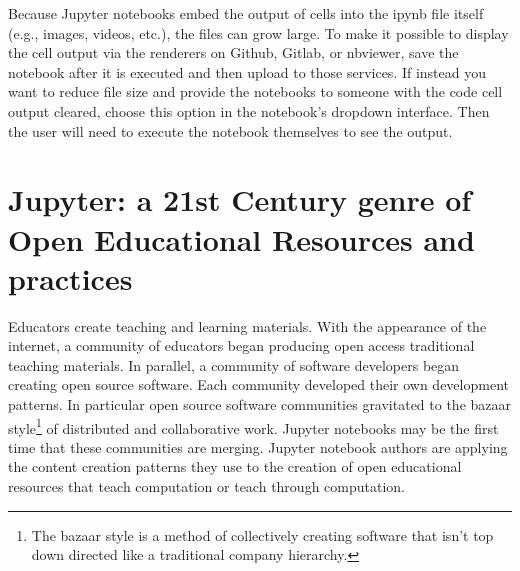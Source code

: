 \documentclass[]{book}
\let\rmarkdownfootnote\footnote%
\def\footnote{\protect\rmarkdownfootnote}
\begin{document}
Because Jupyter notebooks embed the output of cells into the ipynb file
itself (e.g., images, videos, etc.), the files can grow large. To make
it possible to display the cell output via the renderers on Github,
Gitlab, or nbviewer, save the notebook after it is executed and then
upload to those services. If instead you want to reduce file size and
provide the notebooks to someone with the code cell output cleared,
choose this option in the notebook's dropdown interface. Then the user
will need to execute the notebook themselves to see the output.

\section{Jupyter: a 21st Century genre of Open Educational Resources and
practices}\label{jupyter-a-21st-century-genre-of-open-educational-resources-and-practices}

Educators create teaching and learning materials. With the appearance of
the internet, a community of educators began producing open access
traditional teaching materials. In parallel, a community of software
developers began creating open source software. Each community developed
their own development patterns. In particular open source software
communities gravitated to the bazaar style\footnote{The bazaar style is
  a method of collectively creating software that isn't top down
  directed like a traditional company hierarchy.} of distributed and
collaborative work. Jupyter notebooks may be the first time that these
communities are merging. Jupyter notebook authors are applying the
content creation patterns they use to the creation of open educational
resources that teach computation or teach through computation.
\end{document}
